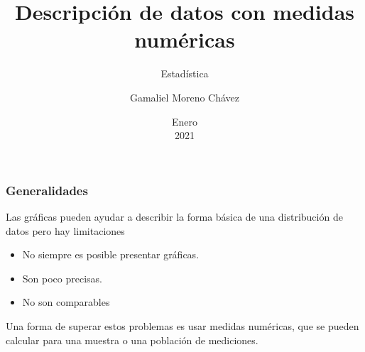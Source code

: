 \documentclass[spanish]{beamer}
\begin{document}
\title{Descripción de datos con medidas numéricas}
\subtitle{Estadística}
\author{Gamaliel Moreno Chávez}
\date{Enero\\ 2021}%

\frame{\titlepage}

\begin{frame}
\frametitle{Generalidades}
Las gráficas pueden ayudar a describir la forma básica de una distribución de datos pero hay limitaciones
\begin{itemize}
\item No siempre es posible presentar gráficas.
\item Son poco precisas.
\item No son comparables
\end{itemize}
Una forma de superar estos problemas es usar medidas numéricas, que se pueden calcular para una muestra o una población de mediciones.
\end{frame}
\end{document}

